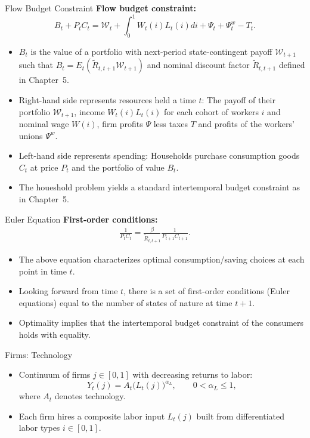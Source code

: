 \documentclass[11pt,aspectratio=169]{beamer}
\begin{document}
\begin{frame}{Flow Budget Constraint}
\textbf{Flow budget constraint:}
\begin{equation}
B_{t}+P_{t}C_{t}=\mathcal{W}_{t}+\int_{0}^{1}W_{t}(i)L_{t}(i)di+\Psi
_{t}+\Psi _{t}^{w}-T_{t}.  
\label{eq2}
\end{equation}
\begin{itemize}
    \item $B_t$ is the value of a portfolio with next-period state-contingent payoff $\mathcal{W}_{t+1}$ such that $B_t = E_t(\tilde{R}_{t,t+1}\mathcal{W}_{t+1})$ and nominal discount factor $\tilde{R}_{t,t+1}$ defined in Chapter~5.
    \item Right-hand side represents resources held a time $t$: The payoff of their portfolio $\mathcal{W}_{t+1}$, income $W_t(i)L_t(i)$ for each cohort of workers $i$ and nominal wage $W(i)$, firm profits $\Psi$ less taxes $T$ and profits of the workers' unions $\Psi^w$.
    \item Left-hand side represents spending: Households purchase consumption goods $C_t$ at price $P_t$ and the portfolio of value $B_t$. 
    \item The houeshold problem yields a standard intertemporal budget constraint as in Chapter~5.
\end{itemize}
\end{frame}

\begin{frame}{Euler Equation}
\textbf{First-order conditions:}
\begin{align*}
    \frac{1}{P_t C_t}=\frac{\beta}{\tilde{R}_{t,t+1}}\frac{1}{P_{t+1}C_{t+1}}.
\end{align*}
\begin{itemize}
    \item The above equation characterizes optimal consumption/saving choices at each point in time $t$.
    \item Looking forward from time $t$, there is a set of first-order conditions (Euler equations) equal to the number of states of nature at time $t+1$. 
    \item Optimality implies that the intertemporal budget constraint of the consumers holds with equality. 
\end{itemize}
\end{frame}

\begin{frame}{Firms: Technology}
\small
\begin{itemize}
  \item Continuum of firms \(j\in[0,1]\) with decreasing returns to labor:
  \[
    Y_t(j)=A_t\big(L_t(j)\big)^{\alpha_L},
    \qquad 0<\alpha_L\le 1,
  \]
  where \(A_t\) denotes technology.
  \item Each firm hires a composite labor input \(L_t(j)\) built from differentiated labor types \(i\in[0,1]\).
\end{itemize}
\end{frame}
\end{document}
